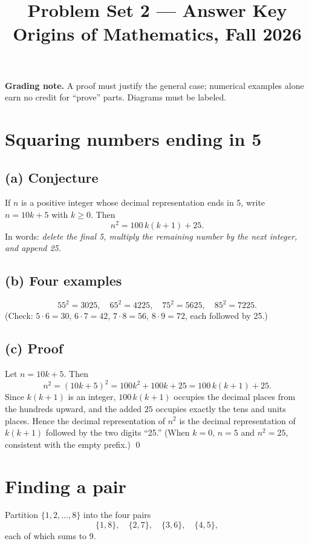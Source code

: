 \documentclass[11pt]{article}
\title{Problem Set 2 --- Answer Key\\\large Origins of Mathematics, Fall 2026}
\author{}
\date{}
\begin{document}
	\maketitle
	
	\noindent\textbf{Grading note.} A proof must justify the general case; numerical examples alone earn no credit for ``prove'' parts. Diagrams must be labeled.
	
	\section{Squaring numbers ending in 5}
	
	\subsection*{(a) Conjecture}
	If $n$ is a positive integer whose decimal representation ends in 5, write $n = 10k+5$ with $k \ge 0$. Then
	\[
	n^2 = 100\,k(k+1) + 25.
	\]
	In words: \emph{delete the final 5, multiply the remaining number by the next integer, and append 25.}
	
	\subsection*{(b) Four examples}
	\[
	55^2 = 3025,\quad 65^2 = 4225,\quad 75^2 = 5625,\quad 85^2 = 7225.
	\]
	(Check: $5\cdot 6=30$, $6\cdot 7=42$, $7\cdot 8=56$, $8\cdot 9=72$, each followed by 25.)
	
	\subsection*{(c) Proof}
	Let $n = 10k+5$. Then
	\[
	n^2 = (10k+5)^2 = 100k^2 + 100k + 25 = 100\,k(k+1) + 25.
	\]
	Since $k(k+1)$ is an integer, $100\,k(k+1)$ occupies the decimal places from the hundreds upward, and the added $25$ occupies exactly the tens and units places. Hence the decimal representation of $n^2$ is the decimal representation of $k(k+1)$ followed by the two digits ``25.'' (When $k=0$, $n=5$ and $n^2=25$, consistent with the empty prefix.) \qed
	
	\section{Finding a pair}
	
	Partition $\{1,2,\dots,8\}$ into the four pairs
	\[
	\{1,8\},\quad \{2,7\},\quad \{3,6\},\quad \{4,5\},
	\]
	each of which sums to $9$.
	
\end{document}
